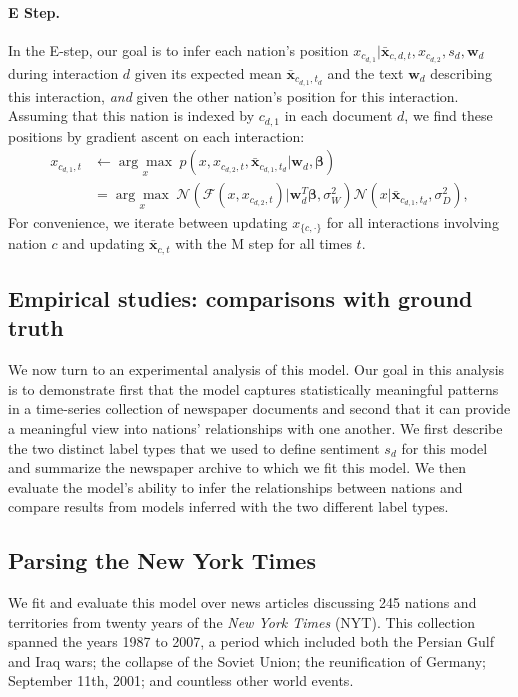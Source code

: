 \paragraph{E Step.} In the E-step, our goal is to infer each nation's
position $x_{c_{d,1}} | \bm \bar{x}_{c,d,t}, x_{c_{d,2}}, s_d, \bm
w_d$ during interaction $d$ given its expected mean $\bm \bar
x_{c_{d,1},t_d}$ and the text $\bm w_d$ describing this interaction,
\emph{and} given the other nation's position for this interaction.
Assuming that this nation is indexed by $c_{d,1}$ in each document $d$, we
find these positions by gradient ascent on each interaction:
\begin{align}
  x_{c_{d, 1}, t} & \gets \underset{ x }
  {\arg \max}\hspace{3pt}
  p(x, x_{c_{d,2},t}, \bm \bar x_{c_{d,1},t_d} | \bm w_d, \bm \beta) \nonumber \\
  & = \underset{x}
  { \arg \max }\hspace{3pt}
  \mathcal{N}( \mathcal{F}(x, x_{c_{d,2},t}) | \bm w_d^T \bm \beta,
  \sigma_W^2 )
  \mathcal{N}( x | \bm \bar x_{c_{d,1},t_d}, \sigma_D^2 ),
\end{align}
For convenience, we iterate between updating $x_{\{c,\cdot\}}$ for all
interactions involving nation $c$ and updating $\bm \bar x_{c,t}$
with the M step for all times $t$.

\subsection{Empirical studies: comparisons with ground truth}
We now turn to an experimental analysis of this model.  Our goal in
this analysis is to demonstrate first that the model captures
statistically meaningful patterns in a time-series collection of
newspaper documents and second that it can provide a meaningful view
into nations' relationships with one another. We first describe the
two distinct label types that we used to define sentiment $s_d$ for
this model and summarize the newspaper archive to which we fit this
model.  We then evaluate the model's ability to infer the
relationships between nations and compare results from models
inferred with the two different label types.

\subsection{Parsing the New York Times}

We fit and evaluate this model over news articles discussing 245
nations and territories from twenty years of the \emph{New York Times}
(NYT).  This collection spanned the years 1987 to 2007, a period which
included both the Persian Gulf and Iraq wars; the collapse of the
Soviet Union; the reunification of Germany; September 11th, 2001; and
countless other world events.

